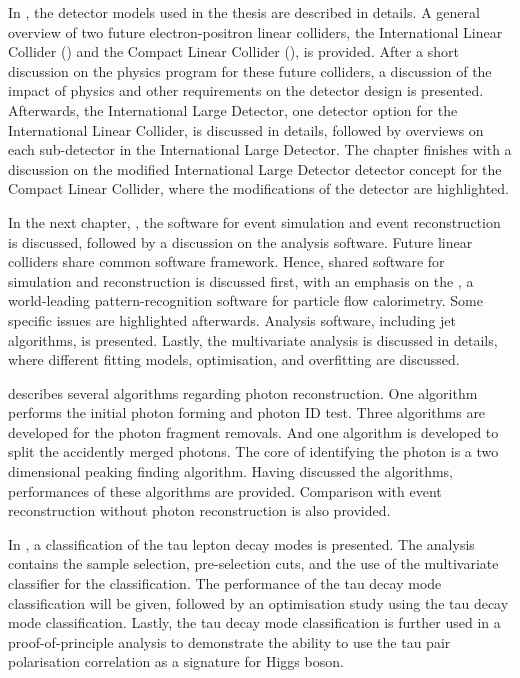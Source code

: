 In , the detector models used in the thesis are described in details. A general overview of two future electron-positron linear colliders, the International Linear Collider (\ILC) and the Compact Linear Collider (\CLIC), is provided. After a short discussion on the physics program for these future colliders, a discussion of the impact of physics and other requirements on the detector design is presented. Afterwards, the International Large Detector, one detector option for the International Linear Collider, is discussed in details, followed by overviews on each sub-detector in the International Large Detector. The chapter finishes with a discussion on the modified International Large Detector detector concept for the Compact Linear Collider, where the modifications of the detector are highlighted.

In the next chapter, , the software for event simulation and event reconstruction is  discussed, followed by a discussion on the analysis software. Future linear colliders share common software framework. Hence, shared software for simulation and reconstruction is discussed first, with an emphasis on the \pandora, a world-leading pattern-recognition software for particle flow calorimetry. Some \CLIC specific issues are highlighted afterwards. Analysis software, including jet algorithms, is presented. Lastly, the multivariate analysis is discussed in details, where different fitting models, optimisation, and overfitting are discussed.


 describes several \pandora algorithms regarding photon reconstruction. One algorithm performs the initial photon forming and photon ID test. Three algorithms are developed for the photon fragment removals. And one algorithm is developed to split the accidently merged photons. The core of identifying the photon is a two dimensional peaking finding algorithm. Having discussed the algorithms, performances of these algorithms are provided. Comparison with event reconstruction without photon reconstruction is also provided.

In , a classification of the tau lepton decay modes is presented. The analysis contains the sample selection, pre-selection cuts, and the use of the multivariate classifier for the classification.  The performance of the tau decay mode classification will be given, followed by an \ECAL optimisation study using the tau decay mode classification. Lastly, the  tau decay mode classification is further used in a proof-of-principle analysis to demonstrate the ability to use the tau pair polarisation correlation as a signature for Higgs boson.


